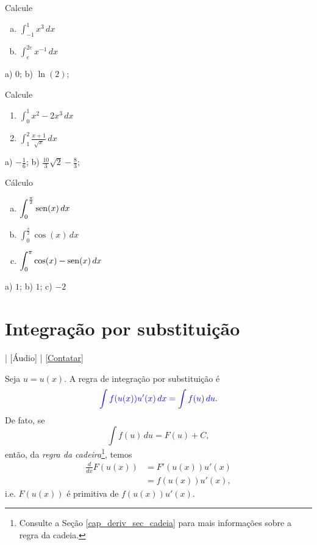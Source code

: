 \begin{exer}
  Calcule
  \begin{enumerate}[a)]
  \item $\displaystyle \int_{-1}^1 x^3\,dx$
  \item $\displaystyle \int_e^{2e} x^{-1}\,dx$
  \end{enumerate}
\end{exer}
\begin{resp}
  a) $0$; b) $\ln(2)$;
\end{resp}

\begin{exer}
  Calcule
  \begin{enumerate}
  \item $\displaystyle \int_0^1 x^2 - 2x^3\,dx$
  \item $\displaystyle \int_1^2 \frac{x+1}{\sqrt{x}}\,dx$
  \end{enumerate}
\end{exer}
\begin{resp}
  a) $\displaystyle -\frac{1}{6}$; b) $\displaystyle \frac{10}{3}\sqrt{2} - \frac{8}{3}$;
\end{resp}

\begin{exer}
  Cálculo
  \begin{enumerate}[a)]
  \item $\displaystyle \int_0^{\frac{\pi}{2}}\operatorname{sen}(x)\,dx$
  \item $\displaystyle \int_0^{\frac{\pi}{2}}\cos(x)\,dx$
  \item $\displaystyle \int_0^{\pi}\cos(x)-\operatorname{sen}(x)\,dx$
  \end{enumerate}
\end{exer}
\begin{resp}
  a) $1$; b) $1$; c) $-2$
\end{resp}

\section{Integração por substituição}\label{cap_int_sec_subs}

\begin{flushright}
  [Vídeo] | [Áudio] | \href{https://phkonzen.github.io/notas/contato.html}{[Contatar]}
\end{flushright}

Seja $u = u(x)$. A regra de integração por substituição é
\begin{equation}
  {\color{blue}\int f(u(x))u'(x)\,dx = \int f(u)\,du}.
\end{equation}
De fato, se
\begin{equation}
  \int f(u)\,du = F(u) + C,
\end{equation}
então, da \emph{regra da cadeira}\footnote{Consulte a Seção \ref{cap_deriv_sec_cadeia} para mais informações sobre a regra da cadeia.}, temos
\begin{align}
  \frac{d}{dx}F(u(x)) &= F'(u(x))u'(x) \\
                      &= f(u(x))u'(x),
\end{align}
i.e. $F(u(x))$ é primitiva de $f(u(x))u'(x)$.

